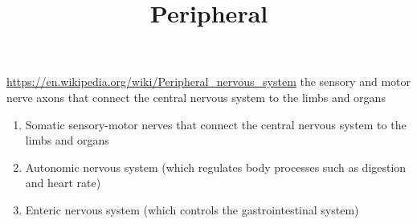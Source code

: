 \documentclass[a4paper]{article}
\title{Peripheral}
\date{}
\begin{document}
    \maketitle
    \url{https://en.wikipedia.org/wiki/Peripheral_nervous_system}
    the sensory and motor nerve axons that connect the central nervous system to the limbs and organs
    \begin{enumerate}
        \item Somatic sensory-motor nerves that connect the central nervous system to the limbs and organs
        \item Autonomic nervous system (which regulates body processes such as digestion and heart rate)
        \item Enteric nervous system (which controls the gastrointestinal system)
    \end{enumerate}
\end{document}
